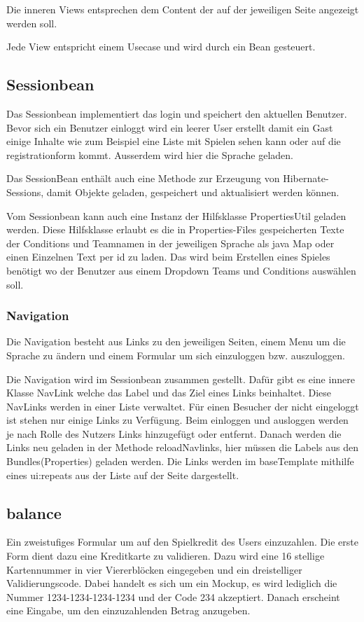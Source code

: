 \documentclass[a4paper, abstracton]{scrartcl}
\begin{document}
  Die inneren Views entsprechen dem Content der auf der jeweiligen Seite
  angezeigt werden soll.
  
  Jede View entspricht einem Usecase und wird durch ein Bean gesteuert.


\subsection{Sessionbean}
  Das Sessionbean implementiert das login und speichert den aktuellen Benutzer.
  Bevor sich ein Benutzer einloggt wird ein leerer User erstellt damit ein Gast
  einige Inhalte wie zum Beispiel eine Liste mit Spielen sehen kann oder auf die
  registrationform kommt.
  Ausserdem wird hier die Sprache geladen.
  
  Das SessionBean enthält auch eine Methode zur Erzeugung von Hibernate-Sessions,
  damit Objekte geladen, gespeichert und aktualisiert werden können.
  
  Vom Sessionbean kann auch eine Instanz der Hilfsklasse PropertiesUtil
  geladen werden. Diese Hilfsklasse erlaubt es die in Properties-Files gespeicherten
  Texte der Conditions und Teamnamen in der jeweiligen Sprache als java Map 
  oder einen Einzelnen Text per id zu laden.
  Das wird beim Erstellen eines Spieles benötigt wo der Benutzer aus einem Dropdown
  Teams und Conditions auswählen soll.
  
\subsubsection{Navigation}
  Die Navigation besteht aus Links zu den jeweiligen Seiten, einem Menu um die
  Sprache zu ändern und einem Formular um sich einzuloggen bzw. auszuloggen.
  
  Die Navigation wird im Sessionbean zusammen gestellt. Dafür gibt es eine innere
  Klasse NavLink welche das Label und das Ziel eines Links beinhaltet.
  Diese NavLinks werden in einer Liste verwaltet. Für einen Besucher der nicht
  eingeloggt ist stehen nur einige Links zu Verfügung. Beim einloggen und ausloggen
  werden je nach Rolle des Nutzers Links hinzugefügt oder entfernt.
  Danach werden die Links neu geladen in der Methode reloadNavlinks, hier müssen
  die Labels aus den Bundles(Properties) geladen werden.
  Die Links werden im baseTemplate mithilfe eines ui:repeats aus der Liste auf
  der Seite dargestellt.

\subsection{balance}
  Ein zweistufiges Formular um auf den Spielkredit des Users einzuzahlen.
  Die erste Form dient dazu eine Kreditkarte zu validieren.
  Dazu wird eine 16 stellige Kartennummer in vier Viererblöcken eingegeben
  und ein dreistelliger Validierungscode.
  Dabei handelt es sich um ein Mockup, es wird lediglich die Nummer
  1234-1234-1234-1234 und der Code 234 akzeptiert.
  Danach erscheint eine Eingabe, um den einzuzahlenden Betrag anzugeben. 
\end{document}
